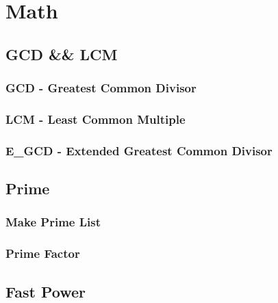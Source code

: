 \section{Math}
	\subsection{GCD \&\& LCM}
		\subsubsection{GCD - Greatest Common Divisor}
			
		\subsubsection{LCM - Least Common Multiple}
			
		\subsubsection{E\_GCD - Extended Greatest Common Divisor}
			
	\subsection{Prime}
		\subsubsection{Make Prime List}
			
		\subsubsection{Prime Factor}
			
	\subsection{Fast Power}
		
